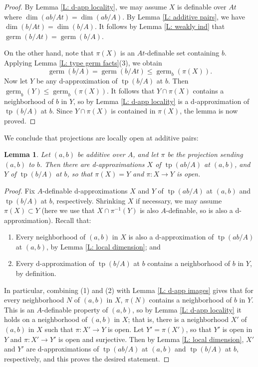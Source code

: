 \documentclass{amsart}
\newtheorem{lemma}[theorem]{Lemma}
\theoremstyle{definition}
\newcommand{\tp}{\operatorname{tp}}
\begin{document}
\begin{proof}
    By Lemma \ref{L: d-app locality}, we may assume $X$ is definable over $At$ where $\dim(ab/At)=\dim(ab/A)$. By Lemma \ref{L: additive pairs}, we have $\dim(b/At)=\dim(b/A)$. It follows by Lemma \ref{L: weakly ind} that $\operatorname{germ}(b/At)=\operatorname{germ}(b/A)$.

    On the other hand, note that $\pi(X)$ is an $At$-definable set containing $b$. Applying Lemma \ref{L: type germ facts}(3), we obtain $$\operatorname{germ}(b/A)=\operatorname{germ}(b/At)\leq\operatorname{germ}_b(\pi(X)).$$ Now let $Y$ be any d-approximation of $\tp(b/A)$ at $b$. Then $\operatorname{germ}_b(Y)\leq\operatorname{germ}_b(\pi(X))$. It follows that $Y\cap\pi(X)$ contains a neighborhood of $b$ in $Y$, so by Lemma \ref{L: d-app locality} is a d-approximation of $\tp(b/A)$ at $b$. Since $Y\cap\pi(X)$ is contained in $\pi(X)$, the lemma is now proved. 
\end{proof}

We conclude that projections are locally open at additive pairs:

\begin{lemma}\label{L: d-app open}
    Let $(a,b)$ be additive over $A$, and let $\pi$ be the projection sending $(a,b)$ to $b$. Then there are d-approximations $X$ of $\tp(ab/A)$ at $(a,b)$, and $Y$ of $\tp(b/A)$ at $b$, so that $\pi(X)=Y$ and $\pi:X\rightarrow Y$ is open.
\end{lemma}

\begin{proof}
    Fix $A$-definable d-approximations $X$ and $Y$ of $\tp(ab/A)$ at $(a,b)$ and $\tp(b/A)$ at $b$, respectively. Shrinking $X$ if necessary, we may assume $\pi(X)\subset Y$ (here we use that $X\cap\pi^{-1}(Y)$ is also $A$-definable, so is also a d-approximation). Recall that:
    \begin{enumerate}
        \item Every neighborhood of $(a,b)$ in $X$ is also a d-approximation of $\tp(ab/A)$ at $(a,b)$, by Lemma \ref{L: local dimension}; and
        \item Every d-approximation of $\tp(b/A)$ at $b$ contains a neighborhood of $b$ in $Y$, by definition.
        \end{enumerate}
        
        In particular, combining (1) and (2) with Lemma \ref{L: d-app images} gives that for every neighborhood $N$ of $(a,b)$ in $X$, $\pi(N)$ contains a neighborhood of $b$ in $Y$. This is an $A$-definable property of $(a,b)$, so by Lemma \ref{L: d-app locality} it holds on a neighborhood of $(a,b)$ in $X$; that is, there is a neighborhood $X'$ of $(a,b)$ in $X$ such that $\pi:X'\rightarrow Y$ is open. Let $Y'=\pi(X')$, so that $Y'$ is open in $Y$ and $\pi:X'\rightarrow Y'$ is open and surjective. Then by Lemma \ref{L: local dimension}, $X'$ and $Y'$ are d-approximations of $\tp(ab/A)$ at $(a,b)$ and $\tp(b/A)$ at $b$, respectively, and this proves the desired statement.
\end{proof}
\end{document}
